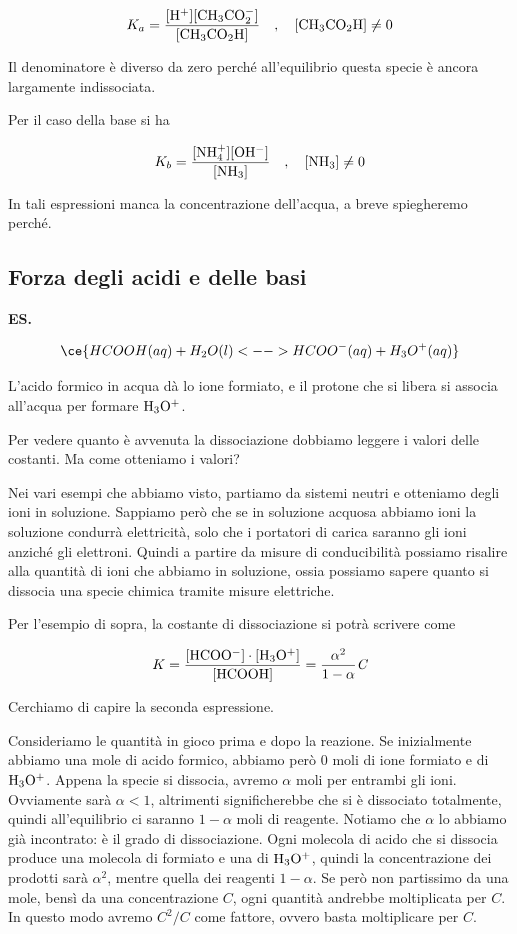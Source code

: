 $$K_a=\rm{\frac{[H^+][CH_3CO_2^-]}{[CH_3CO_2H]}}
\quad,\quad
[CH_3CO_2H] \neq 0$$

Il denominatore è diverso da zero perché all'equilibrio questa specie è ancora largamente indissociata.

Per il caso della base si ha

$$K_b=\rm{\frac{[NH_4^+][OH^-]}{[NH_3]}}
\quad,\quad
[NH_3] \neq 0$$

In tali espressioni manca la concentrazione dell'acqua, a breve spiegheremo perché.
\subsection{Forza degli acidi e delle basi}
\textbf{ES.}

$$\ce{HCOOH(aq) + H_2O(l) <--> HCOO^-(aq) + H_3O^+(aq)}$$

L'acido formico in acqua dà lo ione formiato, e il protone che si libera si associa all'acqua per formare $\rm H_3O^+$.

Per vedere quanto è avvenuta la dissociazione dobbiamo leggere i valori delle costanti. Ma come otteniamo i valori?

Nei vari esempi che abbiamo visto, partiamo da sistemi neutri e otteniamo degli ioni in soluzione. Sappiamo però che se in soluzione acquosa abbiamo ioni la soluzione condurrà elettricità, solo che i portatori di carica saranno gli ioni anziché gli elettroni. Quindi a partire da misure di conducibilità possiamo risalire alla quantità di ioni che abbiamo in soluzione, ossia possiamo sapere quanto si dissocia una specie chimica tramite misure elettriche.

Per l'esempio di sopra, la costante di dissociazione si potrà scrivere come

$$K= \rm{\frac{[HCOO^-]\cdot[H_3O^+]}{[HCOOH]}} = \frac{\alpha^2}{1- \alpha}\textit{C}$$

Cerchiamo di capire la seconda espressione.

Consideriamo le quantità in gioco prima e dopo la reazione. Se inizialmente abbiamo una mole di acido formico, abbiamo però 0 moli di ione formiato e di $\rm H_3O^+$. Appena la specie si dissocia, avremo $\alpha$ moli per entrambi gli ioni. Ovviamente sarà $\alpha<1$, altrimenti significherebbe che si è dissociato totalmente, quindi all'equilibrio ci saranno $1-\alpha$ moli di reagente. Notiamo che $\alpha$ lo abbiamo già incontrato: è il grado di dissociazione. Ogni molecola di acido che si dissocia produce una molecola di formiato e una di $\rm H_3O^+$, quindi la concentrazione dei prodotti sarà $\alpha^2$, mentre quella dei reagenti $1-\alpha$. Se però non partissimo da una mole, bensì da una concentrazione $C$, ogni quantità andrebbe moltiplicata per $C$. In questo modo avremo $C^2/C$ come fattore, ovvero basta moltiplicare per $C$.

